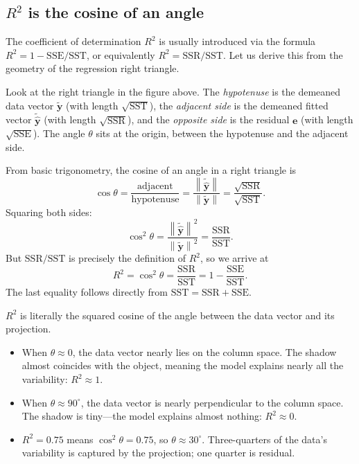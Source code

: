 \documentclass[11pt,a4paper]{article}
\theoremstyle{plain}
\theoremstyle{definition}
\newcommand{\yhat}{\hat{\bm{y}}}
\newcommand{\by}{\bm{y}}
\newcommand{\be}{\bm{e}}
\newcommand{\norm}[1]{\left\lVert #1 \right\rVert}
\begin{document}
\subsection{$R^2$ is the cosine of an angle}\label{sec:r2}

The coefficient of determination $R^2$ is usually introduced via the formula
$R^2 = 1 - \text{SSE}/\text{SST}$, or equivalently
$R^2 = \text{SSR}/\text{SST}$.
Let us derive this from the geometry of the regression right triangle.

Look at the right triangle in the figure above.
The \emph{hypotenuse} is the demeaned data vector $\tilde{\by}$ (with length $\sqrt{\text{SST}}$),
the \emph{adjacent side} is the demeaned fitted vector $\tilde{\yhat}$ (with length $\sqrt{\text{SSR}}$),
and the \emph{opposite side} is the residual $\be$ (with length $\sqrt{\text{SSE}}$).
The angle $\theta$ sits at the origin, between the hypotenuse and the adjacent side.

From basic trigonometry, the cosine of an angle in a right triangle is
\[
  \cos\theta = \frac{\text{adjacent}}{\text{hypotenuse}}
  = \frac{\norm{\tilde{\yhat}}}{\norm{\tilde{\by}}}
  = \frac{\sqrt{\text{SSR}}}{\sqrt{\text{SST}}}.
\]
Squaring both sides:
\[
  \cos^2\theta
  = \frac{\norm{\tilde{\yhat}}^2}{\norm{\tilde{\by}}^2}
  = \frac{\text{SSR}}{\text{SST}}.
\]
But $\text{SSR}/\text{SST}$ is precisely the definition of $R^2$, so we arrive at
\begin{equation}\label{eq:r2}
  \boxed{R^2 = \cos^2\theta = \frac{\text{SSR}}{\text{SST}}
  = 1 - \frac{\text{SSE}}{\text{SST}}.}
\end{equation}
The last equality follows directly from $\text{SST} = \text{SSR} + \text{SSE}$.

\begin{keyinsight}
$R^2$ is literally the squared cosine of the angle between the data vector
and its projection.
\begin{itemize}[nosep]
  \item When $\theta\approx 0$, the data vector nearly lies on the column space.
    The shadow almost coincides with the object, meaning the model explains
    nearly all the variability: $R^2\approx 1$.
  \item When $\theta\approx 90^\circ$, the data vector is nearly perpendicular to the
    column space.  The shadow is tiny---the model explains almost nothing:
    $R^2\approx 0$.
  \item $R^2 = 0.75$ means $\cos^2\theta = 0.75$, so $\theta\approx 30^\circ$.
    Three-quarters of the data's variability is captured by the
    projection; one quarter is residual.
\end{itemize}
\end{keyinsight}
\end{document}
